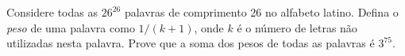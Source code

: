 Considere todas as \(26^{26}\) palavras de comprimento 26 no alfabeto latino. Defina o \emph{peso} de uma palavra como \(1/(k+1)\), onde \(k\) é o número de letras não utilizadas nesta palavra. Prove que a soma dos pesos de todas as palavras é \(3^{75}\).
